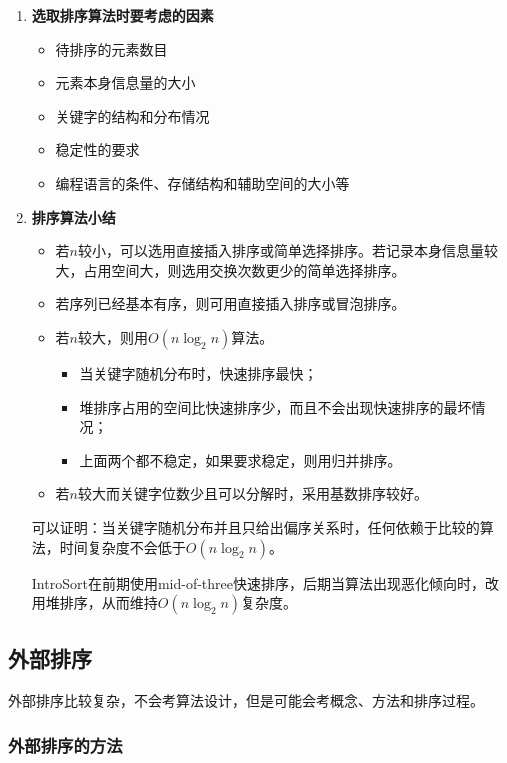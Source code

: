 \documentclass[12pt, a4paper, oneside]{ctexart}
\begin{document}
\begin{enumerate}
  \item {\bf 选取排序算法时要考虑的因素}
  
  \begin{itemize}
    \item 待排序的元素数目
    \item 元素本身信息量的大小
    \item 关键字的结构和分布情况
    \item 稳定性的要求
    \item 编程语言的条件、存储结构和辅助空间的大小等
  \end{itemize}

  \item {\bf 排序算法小结}
  
  \begin{itemize}
    \item 若$n$较小，可以选用直接插入排序或简单选择排序。若记录本身信息量较大，占用空间大，则选用交换次数更少的简单选择排序。
    \item 若序列已经基本有序，则可用直接插入排序或冒泡排序。
    \item 若$n$较大，则用$O(n\log_2 n)$算法。
    \begin{itemize}
      \item 当关键字随机分布时，快速排序最快；
      \item 堆排序占用的空间比快速排序少，而且不会出现快速排序的最坏情况；
      \item 上面两个都不稳定，如果要求稳定，则用归并排序。
    \end{itemize}
    \item 若$n$较大而关键字位数少且可以分解时，采用基数排序较好。
  \end{itemize}

  可以证明：当关键字随机分布并且只给出偏序关系时，任何依赖于比较的算法，时间复杂度不会低于$O(n\log_2 n)$。

  \textcolor{juice-water-blue}{IntroSort在前期使用mid-of-three快速排序，后期当算法出现恶化倾向时，改用堆排序，从而维持$O(n\log_2 n)$复杂度。}
\end{enumerate}

\subsection{外部排序}

外部排序比较复杂，不会考算法设计，但是可能会考概念、方法和排序过程。

\subsubsection{外部排序的方法}
\end{document}
